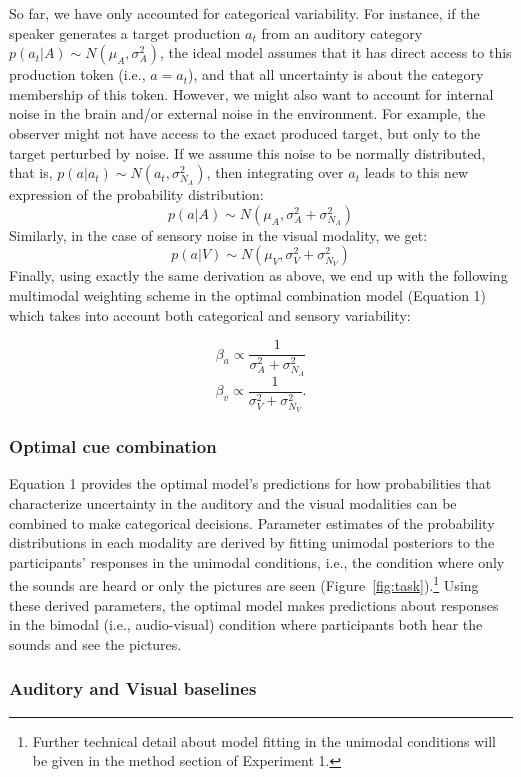 \documentclass[english,floatsintext,man]{apa6}
\theoremstyle{definition}
\theoremstyle{definition}
\theoremstyle{definition}
\theoremstyle{remark}
\begin{document}
So far, we have only accounted for categorical variability. For
instance, if the speaker generates a target production \(a_t\) from an
auditory category \(p(a_t | A) \sim N(\mu_{A}, \sigma^2_{A})\), the
ideal model assumes that it has direct access to this production token
(i.e., \(a=a_t\)), and that all uncertainty is about the category
membership of this token. However, we might also want to account for
internal noise in the brain and/or external noise in the environment.
For example, the observer might not have access to the exact produced
target, but only to the target perturbed by noise. If we assume this
noise to be normally distributed, that is,
\(p(a | a_t) \sim N(a_t, \sigma^2_{N_A})\), then integrating over
\(a_t\) leads to this new expression of the probability distribution:
\[ p(a | A) \sim N(\mu_{A}, \sigma^2_{A}+\sigma^2_{N_A})\] Similarly, in
the case of sensory noise in the visual modality, we get:
\[ p(a | V) \sim N(\mu_{V}, \sigma^2_{V}+\sigma^2_{N_V})\] Finally,
using exactly the same derivation as above, we end up with the following
multimodal weighting scheme in the optimal combination model (Equation
1) which takes into account both categorical and sensory variability:

\[\beta_a \propto \frac{1}{\sigma^2_{A}+\sigma^2_{N_A}}\]
\[\beta_v \propto \frac{1}{\sigma^2_{V} +\sigma^2_{N_V}}.\]

\subsubsection{Optimal cue combination}\label{optimal-cue-combination}

Equation 1 provides the optimal model's predictions for how
probabilities that characterize uncertainty in the auditory and the
visual modalities can be combined to make categorical decisions.
Parameter estimates of the probability distributions in each modality
are derived by fitting unimodal posteriors to the participants'
responses in the unimodal conditions, i.e., the condition where only the
sounds are heard or only the pictures are seen
(Figure~\ref{fig:task}).\footnote{Further technical detail about model fitting in the unimodal conditions will be given in the method section of Experiment 1.}
Using these derived parameters, the optimal model makes predictions
about responses in the bimodal (i.e., audio-visual) condition where
participants both hear the sounds and see the pictures.

\subsubsection{Auditory and Visual
baselines}\label{auditory-and-visual-baselines}
\end{document}

